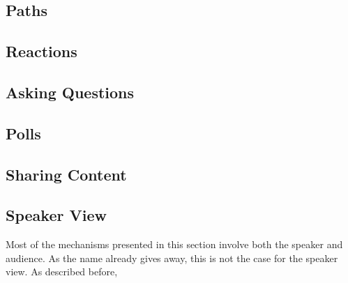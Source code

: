 \subsection{Paths}

\subsection{Reactions}

\subsection{Asking Questions}

\subsection{Polls}

\subsection{Sharing Content}

\subsection{Speaker View}
Most of the mechanisms presented in this section involve both the speaker and audience. As the name already gives away, this is not the case for the speaker view. As described before, 
